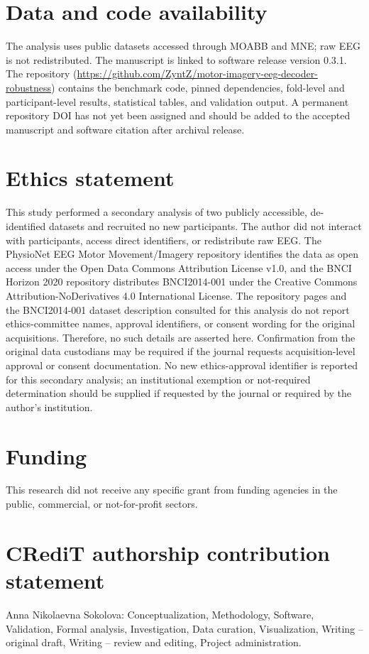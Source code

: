 \documentclass[11pt]{article}
\begin{document}
\section*{Data and code availability}
The analysis uses public datasets accessed through MOABB and MNE; raw EEG is not redistributed. The manuscript is linked to software release version 0.3.1. The repository (\url{https://github.com/ZyntZ/motor-imagery-eeg-decoder-robustness}) contains the benchmark code, pinned dependencies, fold-level and participant-level results, statistical tables, and validation output. A permanent repository DOI has not yet been assigned and should be added to the accepted manuscript and software citation after archival release.

\section*{Ethics statement}
This study performed a secondary analysis of two publicly accessible, de-identified datasets and recruited no new participants. The author did not interact with participants, access direct identifiers, or redistribute raw EEG. The PhysioNet EEG Motor Movement/Imagery repository identifies the data as open access under the Open Data Commons Attribution License v1.0, and the BNCI Horizon 2020 repository distributes BNCI2014-001 under the Creative Commons Attribution-NoDerivatives 4.0 International License. The repository pages and the BNCI2014-001 dataset description consulted for this analysis do not report ethics-committee names, approval identifiers, or consent wording for the original acquisitions. Therefore, no such details are asserted here. Confirmation from the original data custodians may be required if the journal requests acquisition-level approval or consent documentation. No new ethics-approval identifier is reported for this secondary analysis; an institutional exemption or not-required determination should be supplied if requested by the journal or required by the author's institution.

\section*{Funding}
This research did not receive any specific grant from funding agencies in the public, commercial, or not-for-profit sectors.

\section*{CRediT authorship contribution statement}
Anna Nikolaevna Sokolova: Conceptualization, Methodology, Software, Validation, Formal analysis, Investigation, Data curation, Visualization, Writing -- original draft, Writing -- review and editing, Project administration.
\end{document}
